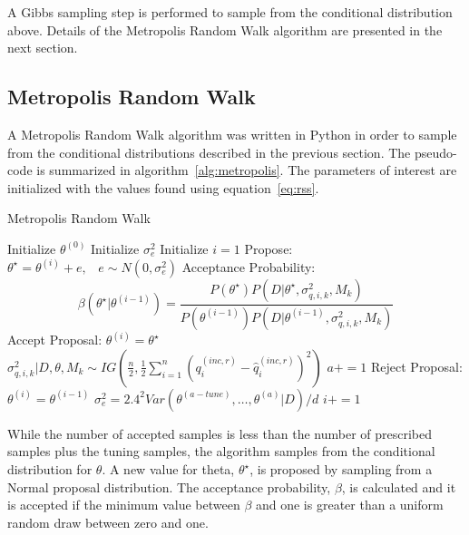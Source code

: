 \documentclass[article]{proc}
\begin{document}
        \noindent A Gibbs sampling step is performed to sample from the conditional distribution above. Details of the Metropolis Random Walk algorithm are presented in the next section.

    \subsection{Metropolis Random Walk}

        A Metropolis Random Walk algorithm was written in Python in order to sample from the conditional distributions described in the previous section. The pseudo-code is summarized in algorithm~\ref{alg:metropolis}. The parameters of interest are initialized with the values found using equation~\ref{eq:rss}.   

        \begin{algorithm}
        \caption{Metropolis Random Walk}\label{alg:metropolis}
        \begin{algorithmic}[1]
        \State Initialize $\theta^{(0)}$
        \State Initialize $\sigma_e^2$
        \State Initialize $i = 1$
            \State Propose: $\theta^{\star} = \theta^{(i)} + e, \hspace{10pt} e \sim N(0, \sigma_e^2)$
            \State Acceptance Probability: $$\beta (\theta^{\star} | \theta^{(i-1)}) = \frac{P(\theta^{\star})P(D|\theta^{\star},\sigma_{q,i,k}^2,M_k)}{P(\theta^{(i-1)})P(D|\theta^{(i-1)},\sigma_{q,i,k}^2, M_k)}$$
                    \State Accept Proposal: $\theta^{(i)} = \theta^{\star}$
                    \State $\sigma_{q,i,k}^2 | D, \theta, M_k \sim IG \left(\frac{n}{2},  \frac{1}{2}\sum_{i=1}^n \left(q_i^{(inc,r)} - \hat{q}_i^{(inc,r)} \right)^2\right)$
                    \State $a+=1$
                \Else
                    \State Reject Proposal: $\theta^{(i)} = \theta^{(i-1)}$
                \EndIf
                \State $\sigma_e^2 = 2.4^2 Var(\theta^{(a-tune)}, \dots, \theta^{(a)}|D)/d$
            \EndWhile
            \State $i+=1$
        \EndWhile
        \end{algorithmic}
        \end{algorithm}

        While the number of accepted samples is less than the number of prescribed samples plus the tuning samples, the algorithm samples from the conditional distribution for $\theta$. A new value for theta, $\theta^{\star}$, is proposed by sampling from a Normal proposal distribution. The acceptance probability, $\beta$, is calculated and it is accepted if the minimum value between $\beta$ and one is greater than a uniform random draw between zero and one.
\end{document}
